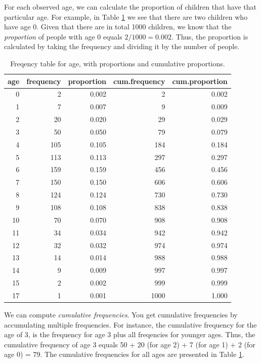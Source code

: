 \documentclass[]{report}\usepackage[]{graphicx}\usepackage[]{color}
\begin{document}
For each observed age, we can calculate the proportion of children that have that particular age. For example, in Table \ref{tab:frequency_1} we see that there are two children who have age 0. Given that there are in total 1000 children, we know that the \textit{proportion} of people with age 0 equals $2/1000=0.002$. Thus, the proportion is calculated by taking the frequency and dividing it by the number of people. 


\begin{table}[ht]
\centering
\caption{Freqency table for age, with proportions and cumulative proportions.} 
\label{tab:frequency_1}
\begin{tabular}{rrrrr}
  \hline
age & frequency & proportion & cum.frequency & cum.proportion \\ 
  \hline
   0 &    2 & 0.002 &    2 & 0.002 \\ 
     1 &    7 & 0.007 &    9 & 0.009 \\ 
     2 &   20 & 0.020 &   29 & 0.029 \\ 
     3 &   50 & 0.050 &   79 & 0.079 \\ 
     4 &  105 & 0.105 &  184 & 0.184 \\ 
     5 &  113 & 0.113 &  297 & 0.297 \\ 
     6 &  159 & 0.159 &  456 & 0.456 \\ 
     7 &  150 & 0.150 &  606 & 0.606 \\ 
     8 &  124 & 0.124 &  730 & 0.730 \\ 
     9 &  108 & 0.108 &  838 & 0.838 \\ 
    10 &   70 & 0.070 &  908 & 0.908 \\ 
    11 &   34 & 0.034 &  942 & 0.942 \\ 
    12 &   32 & 0.032 &  974 & 0.974 \\ 
    13 &   14 & 0.014 &  988 & 0.988 \\ 
    14 &    9 & 0.009 &  997 & 0.997 \\ 
    15 &    2 & 0.002 &  999 & 0.999 \\ 
    17 &    1 & 0.001 & 1000 & 1.000 \\ 
   \hline
\end{tabular}
\end{table}



We can compute \textit{cumulative frequencies}. You get cumulative frequencies by accumulating multiple frequencies. For instance, the cumulative frequency for the age of 3, is the frequency for age 3 plus all freqencies for younger ages. Thus, the cumulative frequency of age 3 equals 50 + 20 (for age 2) + 7 (for age 1) + 2 (for age 0) = 79. The cumulative frequencies for all ages are presented in Table \ref{tab:frequency_1}.
\end{document}
